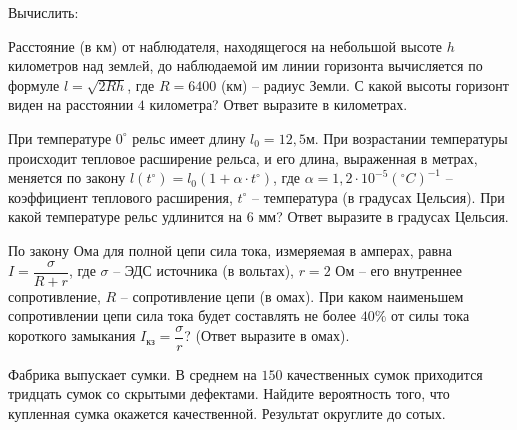 %	
%	
%	
\newpage
{}
\begin{listofex}
	\item Вычислить:
	\begin{enumcols}[itemcolumns=2]
		\item {}
		\item {}
		\item {}
		\item {}
		\item {}
		\item {}
	\end{enumcols}
	\item Расстояние (в км) от наблюдателя, находящегося на небольшой высоте \( h \) километров над землeй, до наблюдаемой им линии горизонта вычисляется по формуле \( l=\sqrt{2Rh} \), где \( R = 6400 \) (км) – радиус Земли. С какой высоты горизонт виден на расстоянии \(4\) километра? Ответ выразите в километрах.
	\item При температуре \( 0^{\circ}  \) рельс имеет длину \( l_0=12,5 \)м. При возрастании температуры происходит тепловое расширение рельса, и его длина, выраженная в метрах, меняется по закону \( l(t^{\circ})=l_0(1+\alpha\cdot t^{\circ}) \), где  \( \alpha=1,2\cdot 10^{-5}(^{\circ}C)^{-1} \) – коэффициент теплового расширения, \( t^{\circ} \) – температура (в градусах Цельсия). При какой температуре рельс удлинится на \( 6 \) мм? Ответ выразите в градусах Цельсия.
	\item По закону Ома для полной цепи сила тока, измеряемая в амперах, равна \( I=\dfrac{\sigma}{R+r} \), где \(\sigma\) – ЭДС источника (в вольтах), \(r=2\) Ом – его внутреннее сопротивление, \(R\) – сопротивление цепи (в омах). При каком наименьшем сопротивлении цепи сила тока будет составлять не более \(40\% \) от силы тока короткого замыкания \( I_{кз} =\dfrac{\sigma}{r}\)? (Ответ выразите в омах).
	\item Фабрика выпускает сумки. В среднем на \( 150 \) качественных сумок приходится тридцать сумок со скрытыми дефектами. Найдите вероятность того, что купленная сумка окажется качественной. Результат округлите до сотых.

\end{listofex}
